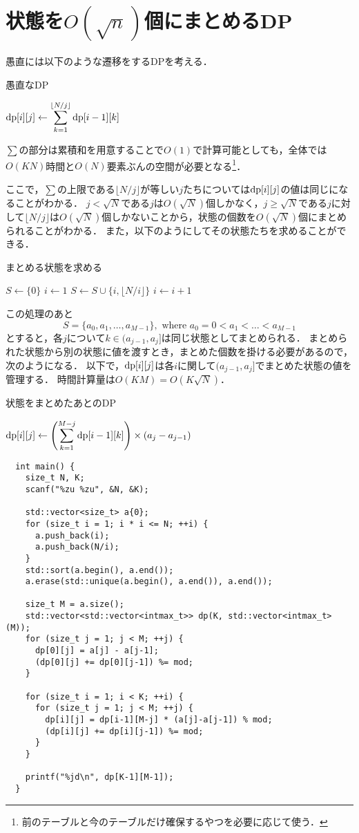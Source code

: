 \documentclass{jsarticle}
\newcommand{\DP}{\ensuremath\mathrm{dp}}
\begin{document}
\section{状態を$O(\sqrt n)$個にまとめるDP}

愚直には以下のような遷移をするDPを考える．
\begin{alg}
  \caption{愚直なDP}
  {
    {
      {$\displaystyle\DP[i][j] \gets \sum_{k=1}^{\lfloor N/j\rfloor} \DP[i-1][k]$}\;
    }
  }
\end{alg}

\noindent
$\sum$の部分は累積和を用意することで$O(1)$で計算可能としても，全体では$O(KN)$時間と$O(N)$要素ぶんの空間が必要となる\footnote{前のテーブルと今のテーブルだけ確保するやつを必要に応じて使う．}．

ここで，$\sum$の上限である$\lfloor N/j\rfloor$が等しい$j$たちについては$\DP[i][j]$の値は同じになることがわかる．
$j < \sqrt N$である$j$は$O(\sqrt N)$個しかなく，$j \ge \sqrt N$である$j$に対して$\lfloor N/j\rfloor$は$O(\sqrt N)$個しかないことから，状態の個数を$O(\sqrt N)$個にまとめられることがわかる．
また，以下のようにしてその状態たちを求めることができる．
\begin{alg}
  \caption{まとめる状態を求める}
  {$S \gets \{0\}$}\;
  {$i \gets 1$}\;
  {
    {$S \gets S \cup \{i, \lfloor N/i\rfloor\}$}\;
    {$i \gets i+1$}\;
  }
\end{alg}
\noindent
この処理のあと
\[S = \{a_0, a_1, \dots, a_{M-1}\},\text{ where }a_0 = 0 < a_1 < \dots < a_{M-1}\]
とすると，各$j$について$k \in (a_{j-1}, a_j]$は同じ状態としてまとめられる．
まとめられた状態から別の状態に値を渡すとき，まとめた個数を掛ける必要があるので，次のようになる．
以下で，$\DP[i][j]$は各$i$に関して$(a_{j-1}, a_j]$でまとめた状態の値を管理する．
時間計算量は$O(KM) = O(K\sqrt N)$．
\begin{alg}
  \caption{状態をまとめたあとのDP}
  {
    {
      {$\displaystyle\DP[i][j] \gets \left(\sum_{k=1}^{M-j}\DP[i-1][k]\right) \times (a_j-a_{j-1})$}\;
    }
  }
\end{alg}

\begin{verbatim}
  int main() {
    size_t N, K;
    scanf("%zu %zu", &N, &K);
  
    std::vector<size_t> a{0};
    for (size_t i = 1; i * i <= N; ++i) {
      a.push_back(i);
      a.push_back(N/i);
    }
    std::sort(a.begin(), a.end());
    a.erase(std::unique(a.begin(), a.end()), a.end());
  
    size_t M = a.size();
    std::vector<std::vector<intmax_t>> dp(K, std::vector<intmax_t>(M));
    for (size_t j = 1; j < M; ++j) {
      dp[0][j] = a[j] - a[j-1];
      (dp[0][j] += dp[0][j-1]) %= mod;
    }
  
    for (size_t i = 1; i < K; ++i) {
      for (size_t j = 1; j < M; ++j) {
        dp[i][j] = dp[i-1][M-j] * (a[j]-a[j-1]) % mod;
        (dp[i][j] += dp[i][j-1]) %= mod;
      }
    }
  
    printf("%jd\n", dp[K-1][M-1]);
  }
\end{verbatim}
\end{document}

